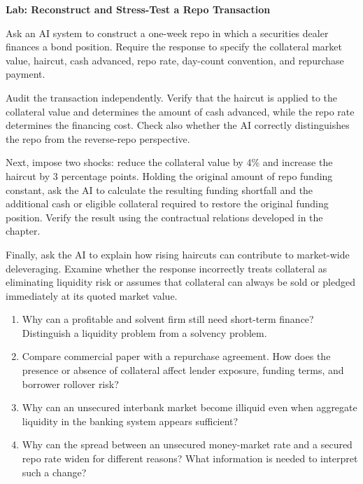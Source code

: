 

\textbf{Lab: Reconstruct and Stress-Test a Repo Transaction}

Ask an AI system to construct a one-week repo in which a securities dealer finances a bond position. Require the response to specify the collateral market value, haircut, cash advanced, repo rate, day-count convention, and repurchase payment.

Audit the transaction independently. Verify that the haircut is applied to the collateral value and determines the amount of cash advanced, while the repo rate determines the financing cost. Check also whether the AI correctly distinguishes the repo from the reverse-repo perspective.

Next, impose two shocks: reduce the collateral value by 4\% and increase the haircut by 3 percentage points. Holding the original amount of repo funding constant, ask the AI to calculate the resulting funding shortfall and the additional cash or eligible collateral required to restore the original funding position. Verify the result using the contractual relations developed in the chapter.

Finally, ask the AI to explain how rising haircuts can contribute to market-wide deleveraging. Examine whether the response incorrectly treats collateral as eliminating liquidity risk or assumes that collateral can always be sold or pledged immediately at its quoted market value.



\begin{enumerate}

\item Why can a profitable and solvent firm still need short-term finance? Distinguish a liquidity problem from a solvency problem.

\item Compare commercial paper with a repurchase agreement. How does the presence or absence of collateral affect lender exposure, funding terms, and borrower rollover risk?

\item Why can an unsecured interbank market become illiquid even when aggregate liquidity in the banking system appears sufficient?

\item Why can the spread between an unsecured money-market rate and a secured repo rate widen for different reasons? What information is needed to interpret such a change?

\end{enumerate}

